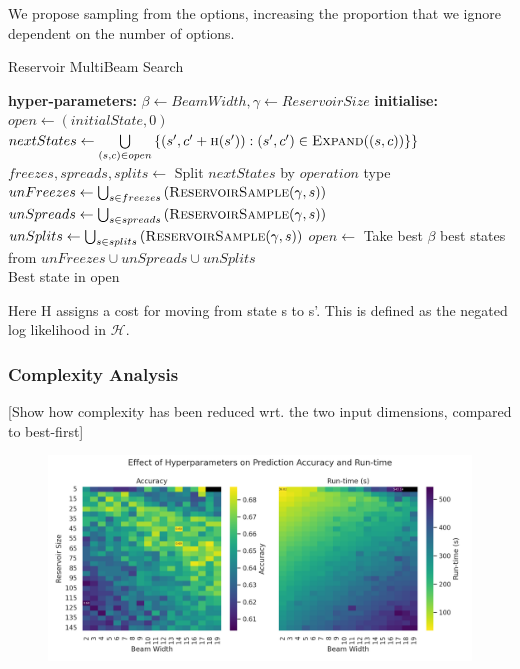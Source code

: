 \documentclass[12pt,a4paper,twoside,openany]{report} \usepackage[pdfborder={0 0 0}]{hyperref}    %
\theoremstyle{definition} \newtheorem{definition}{Definition}[section]
\begin{document}
     We propose sampling from the options, increasing the proportion that we ignore dependent on the number of options.
     \begin{algorithm}[ht] \caption{Reservoir MultiBeam Search} \label{code:stbs0}

  \begin{algorithmic} 
    \State \textbf{hyper-parameters: } $\beta \gets BeamWidth, \gamma \gets ReservoirSize$ 
    \State \textbf{initialise: } $open \gets (initialState, 0)$  
    \State $nextStates \gets \bigcup\limits_{(s, c) \in open} \left\{ (s', c' + \Call{h}{s'}) : (s', c') \in \Call{Expand}{(s,c)}\} \right\}$ 
  \State $freezes, spreads, splits \gets $ Split $nextStates$ by $operation$ type 
  \State $unFreezes \gets \bigcup_{s \in freezes} \left( \Call{ReservoirSample}{\gamma, s} \right)$ 
  \State $unSpreads \gets \bigcup_{s \in spreads} \left( \Call{ReservoirSample}{\gamma, s} \right)$ 
  \State $unSplits \gets \bigcup_{s \in splits} \left( \Call{ReservoirSample}{\gamma, s} \right)$ 
  \State $open \gets $ Take best $\beta$ best states from $unFreezes \cup unSpreads \cup unSplits$ \EndWhile \\
  \Return Best state in open 
  \end{algorithmic} 
  \end{algorithm}

Here H assigns a cost for moving from state s to s'. This is defined as the negated log likelihood in $\mathcal{H}$.
%

  \subsubsection{Complexity Analysis}
  [Show how complexity has been reduced wrt. the two input dimensions, compared to best-first]

  \begin{figure}[ht]
    \begin{center}
      \includegraphics[width=\textwidth]{figs/eval/extParamsAccuracyRuntime.png}
    \end{center}
    \caption{}
    \label{fig:extParamsAccRun}
  \end{figure}
\end{document}
